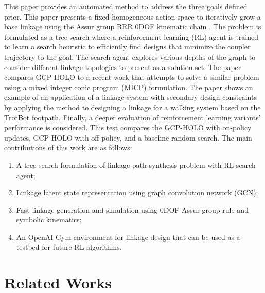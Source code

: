 This paper provides an automated method to address the three goals defined prior. This paper presents a fixed homogeneous action space to iteratively grow a base linkage using the Assur group RRR 0DOF kinematic chain \cite{Assur1913InvestigationII.}. The problem is formulated as a tree search where a reinforcement learning (RL) agent is trained to learn a search heuristic to efficiently find designs that minimize the coupler trajectory to the goal. The search agent explores various depths of the graph to consider different linkage topologies to present as a solution set. The paper compares GCP-HOLO to a recent work that attempts to solve a similar problem using a mixed integer conic program (MICP) formulation. The paper shows an example of an application of a linkage system with secondary design constraints by applying the method to designing a linkage for a walking system based on the TrotBot footpath. Finally, a deeper evaluation of reinforcement learning variants’ performance is considered. This test compares the GCP-HOLO with on-policy updates, GCP-HOLO with off-policy, and a baseline random search. The main contributions of this work are as follows:
\begin{enumerate} 
    \item A tree search formulation of linkage path synthesis problem with RL search agent;
    \item Linkage latent state representation using graph convolution network (GCN);
    \item Fast linkage generation and simulation using 0DOF Assur group rule and symbolic kinematics;
    \item An OpenAI Gym environment for linkage design that can be used as a testbed for future RL algorithms.
\end{enumerate}

\section{Related Works}
